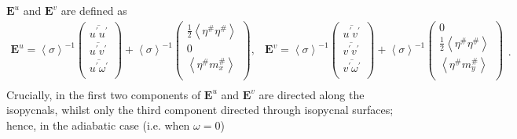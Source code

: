 \documentclass[10pt,a4paper]{article}
\newcommand*\thkmean[1]{\overline{#1}}
\newcommand*\thkres[1]{{#1}^{\prime}}
\newcommand*\nthkmean[1]{\left\langle{#1}\right\rangle}
\newcommand*\nthkres[1]{{#1}^{\#}}
\begin{document}
                   $\boldsymbol{E}^{u}$ and $\boldsymbol{E}^{v}$ are defined as
                   \begin{equation}
                   \begin{array}{cc}
                   \boldsymbol{E}^{u}=\nthkmean{\sigma}^{-1}\left(
                   \begin{array}{c}
                   \thkmean{\thkres{u}\thkres{u}} \\
                   \thkmean{\thkres{u}\thkres{v}} \\
                    \thkmean{\thkres{u}\thkres{\omega}} \\
                   \end{array}\right)+\nthkmean{\sigma}^{-1}\left(
                   \begin{array}{c}
                   \frac{1}{2}\nthkmean{\nthkres{\eta}\nthkres{\eta}} \\
                   0 \\
                   \nthkmean{\nthkres{\eta}\nthkres{m}_{x}} \\
                   \end{array}\right), &
                   \boldsymbol{E}^{v}=\nthkmean{\sigma}^{-1}\left(
                   \begin{array}{c}
                   \thkmean{\thkres{u}\thkres{v}} \\
                   \thkmean{\thkres{v}\thkres{v}} \\
                   \thkmean{\thkres{v}\thkres{\omega}} \\
                   \end{array}\right)+\nthkmean{\sigma}^{-1}\left(
                   \begin{array}{c}
                   0\\
                   \frac{1}{2}\nthkmean{\nthkres{\eta}\nthkres{\eta}} \\
                   \nthkmean{\nthkres{\eta}\nthkres{m}_{y}} \\
                   \end{array}\right) \\
                   \end{array}.
                   \end{equation}
                   Crucially, in \cite{young2012exact} the first two components of  $\boldsymbol{E}^{u}$ and $\boldsymbol{E}^{v}$ are directed along 
                   the isopycnals, whilst only  the third component directed through 
                   isopycnal surfaces; hence, in the adiabatic case (i.e. when $\omega=0$)
\end{document}
